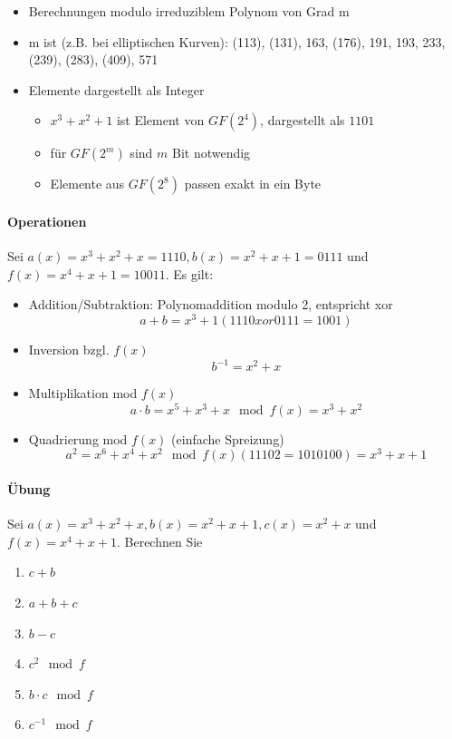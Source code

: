 \begin{itemize}
    \item Berechnungen modulo irreduziblem Polynom von Grad m
    \item m ist (z.B. bei elliptischen Kurven): (113), (131), 163, (176), 191, 193, 233, (239), (283), (409), 571
    \item Elemente dargestellt als Integer
    \begin{itemize}
        \item $x^3+x^2+1$ ist Element von $GF(2^4)$, dargestellt als $1101$
        \item für $GF(2^m)$ sind $m$ Bit notwendig
        \item Elemente aus $GF(2^8)$ passen exakt in ein Byte
    \end{itemize}
\end{itemize}

\paragraph{Operationen}

Sei $a(x) = x^3+x^2+x = 1110, b(x) = x^2+x+1 = 0111$ und $f(x) = x^4+x+1 = 10011$. Es gilt:

\begin{itemize}
    \item Addition/Subtraktion: Polynomaddition modulo 2, entspricht xor
        $$a + b = x^3+1 (1110 xor 0111 = 1001)$$
    \item Inversion bzgl. $f(x)$
        $$b^{-1} = x^2+x$$
    \item Multiplikation mod $f(x)$
        $$a \cdot b = x^5+x^3+x \mod f(x) = x^3+x^2$$
    \item Quadrierung mod $f(x)$ (einfache Spreizung)
    $$ a^2 = x^6+x^4+x^2 \mod f(x) (11102 = 1010100) = x^3+x+1$$
\end{itemize}

\paragraph{Übung}

Sei $a(x) = x^3 + x^2 + x, b(x) = x^2+x+1, c(x) = x^2+x$ und $f(x) = x^4+x+1$. Berechnen Sie

\begin{enumerate}
    \item $c + b$
    \item $a + b + c$
    \item $b - c$
    \item $c^2 \mod f$
    \item $b \cdot c \mod f$
    \item $c^{-1} \mod f$
\end{enumerate}

